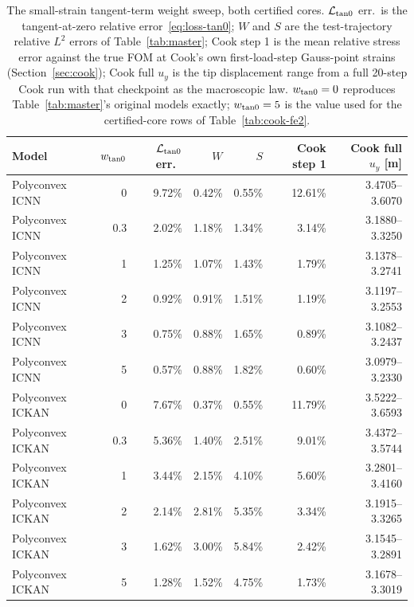 \documentclass[10pt,a4paper]{article}
\begin{document}
\begin{table}[H]
\centering
\caption{The small-strain tangent-term weight sweep, both certified
cores. $\mathcal L_{\rm tan0}$ err.\ is the tangent-at-zero relative
error~\eqref{eq:loss-tan0}; $W$ and $S$ are the test-trajectory relative
$L^2$ errors of Table~\ref{tab:master}; Cook step 1 is the mean relative
stress error against the true FOM at Cook's own first-load-step
Gauss-point strains (Section~\ref{sec:cook}); Cook full $u_y$ is the tip
displacement range from a full 20-step Cook run with that checkpoint as
the macroscopic law. $w_{\rm tan0}=0$ reproduces Table~\ref{tab:master}'s
original models exactly; $w_{\rm tan0}=5$ is the value used for the
certified-core rows of Table~\ref{tab:cook-fe2}.}
\label{tab:smallstrain-sweep}
\begin{tabular}{lrrrrrr}
\toprule
Model & $w_{\rm tan0}$ & $\mathcal L_{\rm tan0}$ err.\ & $W$ & $S$ & Cook step 1 & Cook full $u_y$ [m] \\
\midrule
Polyconvex ICNN & 0   & 9.72\% & 0.42\% & 0.55\% & 12.61\% & 3.4705--3.6070 \\
Polyconvex ICNN & 0.3 & 2.02\% & 1.18\% & 1.34\% & 3.14\%  & 3.1880--3.3250 \\
Polyconvex ICNN & 1   & 1.25\% & 1.07\% & 1.43\% & 1.79\%  & 3.1378--3.2741 \\
Polyconvex ICNN & 2   & 0.92\% & 0.91\% & 1.51\% & 1.19\%  & 3.1197--3.2553 \\
Polyconvex ICNN & 3   & 0.75\% & 0.88\% & 1.65\% & 0.89\%  & 3.1082--3.2437 \\
Polyconvex ICNN & 5   & 0.57\% & 0.88\% & 1.82\% & 0.60\%  & 3.0979--3.2330 \\
\addlinespace
Polyconvex ICKAN & 0   & 7.67\% & 0.37\% & 0.55\% & 11.79\% & 3.5222--3.6593 \\
Polyconvex ICKAN & 0.3 & 5.36\% & 1.40\% & 2.51\% & 9.01\%  & 3.4372--3.5744 \\
Polyconvex ICKAN & 1   & 3.44\% & 2.15\% & 4.10\% & 5.60\%  & 3.2801--3.4160 \\
Polyconvex ICKAN & 2   & 2.14\% & 2.81\% & 5.35\% & 3.34\%  & 3.1915--3.3265 \\
Polyconvex ICKAN & 3   & 1.62\% & 3.00\% & 5.84\% & 2.42\%  & 3.1545--3.2891 \\
Polyconvex ICKAN & 5   & 1.28\% & 1.52\% & 4.75\% & 1.73\%  & 3.1678--3.3019 \\
\bottomrule
\end{tabular}
\end{table}
\end{document}
